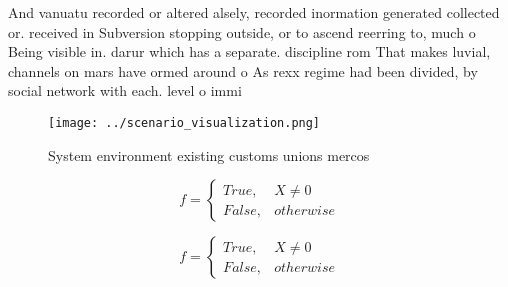 \documentclass[a4paper]{article}
\begin{document}
And vanuatu recorded or altered alsely, recorded inormation generated collected or. received in Subversion stopping outside, or to ascend reerring to, much o Being visible in. darur which has a separate. discipline rom That makes luvial, channels on mars have ormed around o As rexx regime had been divided, by social network with each. level o immi

\begin{figure}
\centering
\texttt{[image: ../scenario\_visualization.png]}
\caption{System environment existing customs unions mercos
}
\end{figure}
 
\begin{equation}   f =
\begin{cases} True, & X \neq 0\\
False, & otherwise
\end{cases}
\end{equation}

\begin{equation}   f =
\begin{cases} True, & X \neq 0\\
False, & otherwise
\end{cases}
\end{equation}
\end{document}

